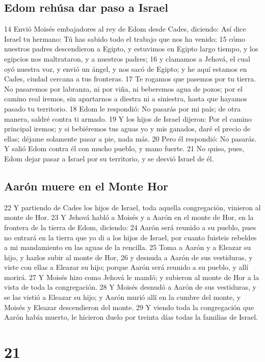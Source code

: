 \section*{Edom rehúsa dar paso a Israel}

14 Envió Moisés embajadores al rey de Edom desde Cades, diciendo: Así dice Israel tu hermano: Tú has sabido todo el trabajo que nos ha venido;
15 cómo nuestros padres descendieron a Egipto, y estuvimos en Egipto largo tiempo, y los egipcios nos maltrataron, y a nuestros padres;
16 y clamamos a Jehová, el cual oyó nuestra voz, y envió un ángel, y nos sacó de Egipto; y he aquí estamos en Cades, ciudad cercana a tus fronteras.
17 Te rogamos que pasemos por tu tierra. No pasaremos por labranza, ni por viña, ni beberemos agua de pozos; por el camino real iremos, sin apartarnos a diestra ni a siniestra, hasta que hayamos pasado tu territorio.
18 Edom le respondió: No pasarás por mi país; de otra manera, saldré contra ti armado.
19 Y los hijos de Israel dijeron: Por el camino principal iremos; y si bebiéremos tus aguas yo y mis ganados, daré el precio de ellas; déjame solamente pasar a pie, nada más.
20 Pero él respondió: No pasarás. Y salió Edom contra él con mucho pueblo, y mano fuerte.
21 No quiso, pues, Edom dejar pasar a Israel por su territorio, y se desvió Israel de él.
\section*{Aarón muere en el Monte Hor}

22 Y partiendo de Cades los hijos de Israel, toda aquella congregación, vinieron al monte de Hor.
23 Y Jehová habló a Moisés y a Aarón en el monte de Hor, en la frontera de la tierra de Edom, diciendo:
24 Aarón será reunido a su pueblo, pues no entrará en la tierra que yo di a los hijos de Israel, por cuanto fuisteis rebeldes a mi mandamiento en las aguas de la rencilla.
25 Toma a Aarón y a Eleazar su hijo, y hazlos subir al monte de Hor,
26 y desnuda a Aarón de sus vestiduras, y viste con ellas a Eleazar su hijo; porque Aarón será reunido a su pueblo, y allí morirá.
27 Y Moisés hizo como Jehová le mandó; y subieron al monte de Hor a la vista de toda la congregación.
28 Y Moisés desnudó a Aarón de sus vestiduras, y se las vistió a Eleazar su hijo; y Aarón murió allí en la cumbre del monte, y Moisés y Eleazar descendieron del monte.
29 Y viendo toda la congregación que Aarón había muerto, le hicieron duelo por treinta días todas la familias de Israel.

\chapter{21}

